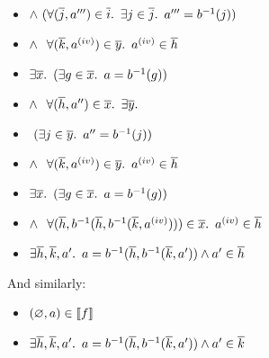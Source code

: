 \begin{itemize}
  \item[\phantom{\imps}]
    \quad\quad\quad$\land~(\forall (\overline{j},a^{\prime\prime\prime})\in\overline{i}\ldotp~\exists j\in\overline{j}\ldotp~a^{\prime\prime\prime}=b^{-1}(j))$

  \item[\phantom{\imps}]
    \quad\quad\quad$\land~\phantom{(}\forall (\overline{k},a^{\text (iv)})\in\overline{y}\ldotp~a^{\text (iv)}\in\overline{h}$
  \addtolength{\itemsep}{.5\baselineskip}

  \item[\iffs]
    $\exists \overline{x}\ldotp~(\exists g\in\overline{x}\ldotp~a = b^{-1}(g))$

  \addtolength{\itemsep}{-.5\baselineskip}
  \item[\phantom{\imps}]
    \quad $\land~\phantom{(}\forall(\overline{h},a^{\prime\prime})\in\overline{x}\ldotp~\exists\overline{y}\ldotp$

  \item[\phantom{\imps}]
    \quad\quad\quad\phantom{$\land$}$~(\exists j\in\overline{y}\ldotp~a^{\prime\prime}=b^{-1}(j))$

  \item[\phantom{\imps}]
    \quad\quad\quad$\land~\phantom{(}\forall (\overline{k},a^{\text (iv)})\in\overline{y}\ldotp~a^{\text (iv)}\in\overline{h}$
  \addtolength{\itemsep}{.5\baselineskip}

  \item[\iffs]
    $\exists \overline{x}\ldotp~(\exists g\in\overline{x}\ldotp~a = b^{-1}(g))$

  \addtolength{\itemsep}{-.5\baselineskip}
  \item[\phantom{\imps}]
    \quad $\land~\phantom{(}\forall(\overline{h},b^{-1}(\overline{h},b^{-1}(\overline{k}, a^{\text (iv)})))\in\overline{x}\ldotp~a^{\text (iv)}\in\overline{h}$
  \addtolength{\itemsep}{.5\baselineskip}

  \item[\iffs]
    $\exists\overline{h},\overline{k},a^\prime\ldotp~a = b^{-1}(\overline{h}, b^{-1}(\overline{k},a^\prime))\land a^\prime\in\overline{h}$
\end{itemize}

And similarly:

\begin{itemize}
  \item[\phantom{\imps}]
    $(\varnothing,a)\in\llbracket f \rrbracket$

  \item[\iffs]
    $\exists\overline{h},\overline{k},a^\prime\ldotp~a = b^{-1}(\overline{h}, b^{-1}(\overline{k},a^\prime))\land a^\prime\in\overline{k}$

\end{itemize}

